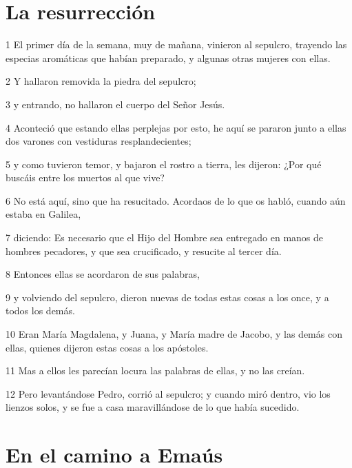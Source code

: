 \section*{La resurrección}

\par 1 El primer día de la semana, muy de mañana, vinieron al sepulcro, trayendo las especias aromáticas que habían preparado, y algunas otras mujeres con ellas.
\par 2 Y hallaron removida la piedra del sepulcro;
\par 3 y entrando, no hallaron el cuerpo del Señor Jesús.
\par 4 Aconteció que estando ellas perplejas por esto, he aquí se pararon junto a ellas dos varones con vestiduras resplandecientes;
\par 5 y como tuvieron temor, y bajaron el rostro a tierra, les dijeron: ¿Por qué buscáis entre los muertos al que vive?
\par 6 No está aquí, sino que ha resucitado. Acordaos de lo que os habló, cuando aún estaba en Galilea,
\par 7 diciendo: Es necesario que el Hijo del Hombre sea entregado en manos de hombres pecadores, y que sea crucificado, y resucite al tercer día.
\par 8 Entonces ellas se acordaron de sus palabras,
\par 9 y volviendo del sepulcro, dieron nuevas de todas estas cosas a los once, y a todos los demás.
\par 10 Eran María Magdalena, y Juana, y María madre de Jacobo, y las demás con ellas, quienes dijeron estas cosas a los apóstoles.
\par 11 Mas a ellos les parecían locura las palabras de ellas, y no las creían.
\par 12 Pero levantándose Pedro, corrió al sepulcro; y cuando miró dentro, vio los lienzos solos, y se fue a casa maravillándose de lo que había sucedido.

\section*{En el camino a Emaús}

